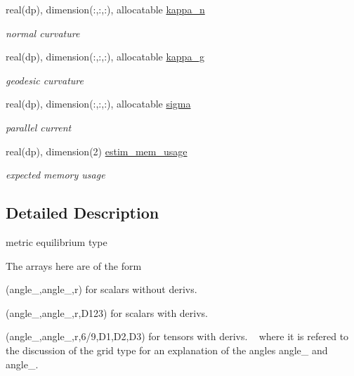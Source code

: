 \begin{DoxyCompactItemize}
real(dp), dimension(\+:,\+:,\+:), allocatable \hyperlink{structeq__vars_1_1eq__2__type_a4ddc178716da01997e4ee251554b7341}{kappa\+\_\+n}
\begin{DoxyCompactList}\small\item\em normal curvature \end{DoxyCompactList}\item 
real(dp), dimension(\+:,\+:,\+:), allocatable \hyperlink{structeq__vars_1_1eq__2__type_a4652c259ba9e243ca2cd3f78fbf4f5ac}{kappa\+\_\+g}
\begin{DoxyCompactList}\small\item\em geodesic curvature \end{DoxyCompactList}\item 
real(dp), dimension(\+:,\+:,\+:), allocatable \hyperlink{structeq__vars_1_1eq__2__type_a330a92ba51576cfb9ff091b2eb633b94}{sigma}
\begin{DoxyCompactList}\small\item\em parallel current \end{DoxyCompactList}\item 
real(dp), dimension(2) \hyperlink{structeq__vars_1_1eq__2__type_a7b277d4e3358de3cbf97f66e91608025}{estim\+\_\+mem\+\_\+usage}
\begin{DoxyCompactList}\small\item\em expected memory usage \end{DoxyCompactList}\end{DoxyCompactItemize}


\subsection{Detailed Description}
metric equilibrium type 

The arrays here are of the form
\begin{DoxyItemize}
\item {\ttfamily (angle\+\_,angle\+\_,r)} for scalars without derivs.
\item {\ttfamily (angle\+\_,angle\+\_,r,D123)} for scalars with derivs.
\item {\ttfamily (angle\+\_,angle\+\_,r,6/9,D1,D2,D3)} for tensors with derivs. ~\newline
 where it is refered to the discussion of the grid type for an explanation of the angles {\ttfamily angle\+\_} and {\ttfamily angle\+\_}.
\end{DoxyItemize}


